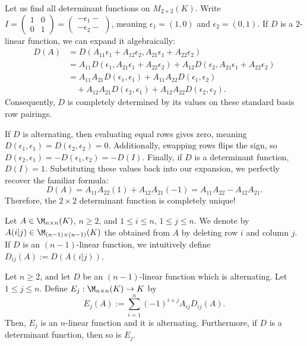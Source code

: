 \begin{example}[Warmup]
  Let us find all determinant functions on $M_{2 \times 2}(K)$. Write $I = \left(\begin{smallmatrix} 1 & 0 \\ 0 & 1 \end{smallmatrix}\right) = \left(\begin{smallmatrix} -\epsilon_1- \\ -\epsilon_2- \end{smallmatrix}\right)$, meaning $\epsilon_1 = (1,0)$ and $\epsilon_2 = (0,1)$.
  If $D$ is a $2$-linear function, we can expand it algebraically:
  \begin{align*}
    D(A) &= D(A_{11}\epsilon_1 + A_{12}\epsilon_2, A_{21}\epsilon_1 + A_{22}\epsilon_2) \\
    &= A_{11} D(\epsilon_1, A_{21}\epsilon_1 + A_{22}\epsilon_2) + A_{12} D(\epsilon_2, A_{21}\epsilon_1 + A_{22}\epsilon_2) \\
    &= A_{11}A_{21}D(\epsilon_1, \epsilon_1) + A_{11}A_{22}D(\epsilon_1, \epsilon_2) \\
    &\quad + A_{12}A_{21}D(\epsilon_2, \epsilon_1) + A_{12}A_{22}D(\epsilon_2, \epsilon_2).
  \end{align*}
  Consequently, $D$ is completely determined by its values on these standard basis row pairings.

  If $D$ is alternating, then evaluating equal rows gives zero, meaning $D(\epsilon_1, \epsilon_1) = D(\epsilon_2, \epsilon_2) = 0$. Additionally, swapping rows flips the sign, so $D(\epsilon_2, \epsilon_1) = -D(\epsilon_1, \epsilon_2) = -D(I)$.
  Finally, if $D$ is a determinant function, $D(I) = 1$. Substituting these values back into our expansion, we perfectly recover the familiar formula:
  \[
  D(A) = A_{11}A_{22}(1) + A_{12}A_{21}(-1) = A_{11}A_{22} - A_{12}A_{21}.
  \]
  Therefore, the $2 \times 2$ determinant function is completely unique!
\end{example}

\begin{definition}[Submatrix]\label{def:minor_submatrix}
  Let $A \in \M_{n \times n}(K)$, $n \ge 2$, and $1 \le i \le n$, $1 \le j \le n$. We denote by $A(i|j) \in \M_{(n-1) \times (n-1)}(K)$ the  obtained from $A$ by deleting row $i$ and column $j$. If $D$ is an $(n-1)$-linear function, we intuitively define $D_{ij}(A) := D(A(i|j))$.
\end{definition}

\begin{theorem}\label{thm:recursive_det}
  Let $n \ge 2$, and let $D$ be an $(n-1)$-linear function which is alternating. Let $1 \le j \le n$. Define $E_j : \M_{n \times n}(K) \to K$ by
  \[
  E_j(A) := \sum_{i=1}^n (-1)^{i+j} A_{ij} D_{ij}(A).
  \]
  Then, $E_j$ is an $n$-linear function and it is alternating. Furthermore, if $D$ is a determinant function, then so is $E_j$.
\end{theorem}

